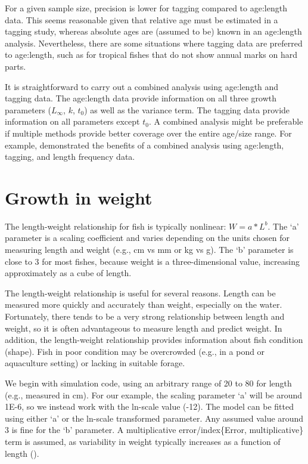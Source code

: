 \documentclass[
]{krantz}
\begin{document}
For a given sample size, precision is lower for tagging compared to age:length data. This seems reasonable given that relative age must be estimated in a tagging study, whereas absolute ages are (assumed to be) known in an age:length analysis. Nevertheless, there are some situations where tagging data are preferred to age:length, such as for tropical fishes that do not show annual marks on hard parts.

It is straightforward to carry out a combined analysis using age:length and tagging data. The age:length data provide information on all three growth parameters (\(L_\infty\), \(k\), \(t_0\)) as well as the variance term. The tagging data provide information on all parameters except \(t_0\). A combined analysis might be preferable if multiple methods provide better coverage over the entire age/size range. For example, \citet{scherrer.etal2021} demonstrated the benefits of a combined analysis using age:length, tagging, and length frequency data.

\hypertarget{LnWgt}{%
\section{Growth in weight}\label{LnWgt}}

The length-weight relationship for fish is typically nonlinear: \(W=a*L^b\). The `a' parameter is a scaling coefficient and varies depending on the units chosen for measuring length and weight (e.g., cm vs mm or kg vs g). The `b' parameter is close to 3 for most fishes, because weight is a three-dimensional value, increasing approximately as a cube of length.

The length-weight relationship is useful for several reasons. Length can be measured more quickly and accurately than weight, especially on the water. Fortunately, there tends to be a very strong relationship between length and weight, so it is often advantageous to measure length and predict weight. In addition, the length-weight relationship provides information about fish condition (shape). Fish in poor condition may be overcrowded (e.g., in a pond or aquaculture setting) or lacking in suitable forage.

We begin with simulation code, using an arbitrary range of 20 to 80 for length (e.g., measured in cm). For our example, the scaling parameter `a' will be around 1E-6, so we instead work with the ln-scale value (-12). The model can be fitted using either `a' or the ln-scale transformed parameter. Any assumed value around 3 is fine for the `b' parameter. A multiplicative error/index\{Error, multiplicative\} term is assumed, as variability in weight typically increases as a function of length (\citet{hayes.brodziack1997}).
\end{document}
